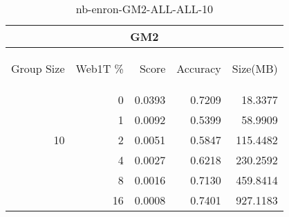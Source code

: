 \begin{center}
\begin{table}[htbp] 
 \begin{center}
\begin{tabular}{ | r | r | r | r | r |}
\hline
\multicolumn{5}{|c|}{GM2}\\
\hline
\begin{sideways}Group Size\end{sideways} & \begin{sideways}Web1T \%\end{sideways} & \begin{sideways}Score\end{sideways} & \begin{sideways}Accuracy\end{sideways} & \begin{sideways}Size(MB)\end{sideways}\\
\hline
\multirow{5}{*}{10}
 & 0 & 0.0393 & 0.7209 & 18.3377\\ \cline{2-5}
 & 1 & 0.0092 & 0.5399 & 58.9909\\ \cline{2-5}
 & 2 & 0.0051 & 0.5847 & 115.4482\\ \cline{2-5}
 & 4 & 0.0027 & 0.6218 & 230.2592\\ \cline{2-5}
 & 8 & 0.0016 & 0.7130 & 459.8414\\ \cline{2-5}
 & 16 & 0.0008 & 0.7401 & 927.1183\\ \cline{2-5}
\hline
\end{tabular}
\caption{nb-enron-GM2-ALL-ALL-10}
\label{table:nb-enron-GM2-ALL-ALL-10}
\end{center}
 \end{table}
\end{center}

